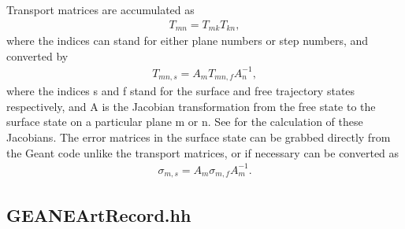  Transport matrices are accumulated as
      \begin{align} %
        T_{mn} = T_{mk}T_{kn},
      \end{align}
  where the indices can stand for either plane numbers or step numbers, and converted by 
      \begin{align} %
        T_{mn,s} = A_{m} T_{mn,f} A_{n}^{-1},
      \end{align}     
  where the indices s and f stand for the surface and free trajectory states respectively, and A is the Jacobian transformation from the free state to the surface state on a particular plane m or n. See \cite{jacob} for the calculation of these Jacobians. The error matrices in the surface state can be grabbed directly from the Geant code unlike the transport matrices, or if necessary can be converted as
      \begin{align} %
        \sigma_{m,s} = A_{m} \sigma_{m,f} A_{m}^{-1}.
      \end{align}  



\subsection{GEANEArtRecord.hh} 


